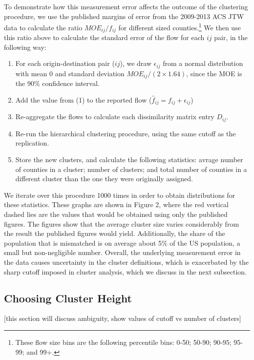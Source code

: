 To demonstrate how this measurement error affects the outcome of the clustering procedure, we use the published margins of error from the 2009-2013 ACS JTW data to calculate the ratio $MOE_{ij}/f_{ij}$ for different sized counties.\footnote{These flow size bins are the following percentile bins: 0-50; 50-90; 90-95; 95-99; and 99+.}  We then use this ratio above to calculate the standard error of the flow for each $ij$ pair, in the following way:

\begin{enumerate}
	\item For each origin-destination pair ($ij$), we draw $\epsilon_{ij}$ from a normal distribution with mean 0 and standard deviation $MOE_{ij}/(2 \times 1.64)$, since the MOE is the 90\% confidence interval.
	\item Add the value from (1) to the reported flow ($\hat{f}_{ij} = f_{ij} + \epsilon_{ij}$)
	\item Re-aggregate the flows to calculate each dissimilarity matrix entry $D_{ij}$. 
	\item Re-run the hierarchical clustering procedure, using the same cutoff as the replication.
	\item Store the new clusters, and calculate the following statistics: avrage number of counties in a cluster; number of clusters; and total number of counties in a different cluster than the one they were originally assigned.
\end{enumerate}

We iterate over this procedure 1000 times in order to obtain distributions for these statistics. These graphs are shown in Figure 2, where the red vertical dashed lies are the values that would be obtained using only the published figures. The figures show that the average cluster size varies considerably from the result the published figures would yield. Additionally, the share of the population that is mismatched is on average about 5\% of the US population, a small but non-negligible number. Overall, the underlying measurement error in the data causes uncertainty in the cluster definitions, which is exacerbated by the sharp cutoff imposed in cluster analysis, which we discuss in the next subsection.

\subsection{Choosing Cluster Height}

[this section will discuss ambiguity, show values of cutoff vs number of clusters]


